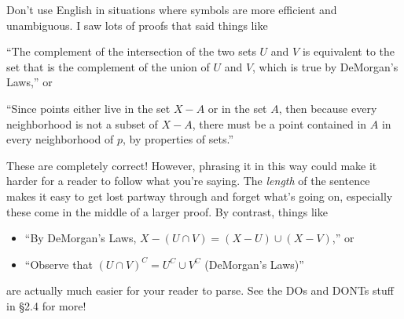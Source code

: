 \documentclass{fkpset}
\begin{document}
\begin{problem}[A8]
  Don't use English in situations where symbols are more efficient and
  unambiguous. I saw lots of proofs that said things like
  \begin{leftbar}
    ``The complement of the intersection of the two sets $U$ and $V$ is
    equivalent to the set that is the complement of the union of $U$ and $V$,
    which is true by DeMorgan's Laws,'' or
  \end{leftbar}
  \begin{leftbar}
    ``Since points either live in the set $X-A$ or in the set $A$, then
    because every neighborhood is not a subset of $X-A$, there must be a point
    contained in $A$ in every neighborhood of $p$, by properties of sets.''
  \end{leftbar}
  These are completely correct! However, phrasing it in this way could make it
  harder for a reader to follow what you're saying. The \emph{length} of the
  sentence makes it easy to get lost partway through and forget what's going on,
  especially these come in the middle of a larger proof. By contrast, things
  like\vspace{.5em}
  \begin{itemize}
    \item ``By DeMorgan's Laws, $X - (U \cap V) = (X-U) \cup (X-V)$,'' or
      \vspace{.5em}
    \item ``Observe that $(U \cap V)^C = U^C \cup V^C$ (DeMorgan's Laws)''
  \end{itemize}
  \vspace{.5em}
  are actually much easier for your reader to parse. See the DOs and DONTs
  stuff in \S 2.4 for more!
\end{problem}
\end{document}
